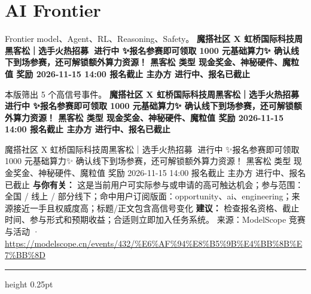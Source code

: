 \documentclass[10.5pt]{ctexart}
\begin{document}
\section*{AI Frontier}
{\color{ormuted} Frontier model、Agent、RL、Reasoning、Safety。}
\vspace{2mm}
{\LARGE\bfseries 魔搭社区 X 虹桥国际科技周黑客松｜选手火热招募🚀 进行中 ✨报名参赛即可领取 1000 元基础算力✨ 确认线下到场参赛，还可解锁额外算力资源！ 黑客松 类型 现金奖金、神秘硬件、魔粒值 奖励 2026-11-15 14:00 报名截止 主办方 进行中、报名已截止}\par
\vspace{1mm}
{\color{ormuted} 本版筛出 5 个高信号事件。}
\vspace{3mm}
{\Large\bfseries 魔搭社区 X 虹桥国际科技周黑客松｜选手火热招募🚀 进行中 ✨报名参赛即可领取 1000 元基础算力✨ 确认线下到场参赛，还可解锁额外算力资源！ 黑客松 类型 现金奖金、神秘硬件、魔粒值 奖励 2026-11-15 14:00 报名截止 主办方 进行中、报名已截止}\par
魔搭社区 X 虹桥国际科技周黑客松｜选手火热招募🚀 进行中 ✨报名参赛即可领取 1000 元基础算力✨ 确认线下到场参赛，还可解锁额外算力资源！ 黑客松 类型 现金奖金、神秘硬件、魔粒值 奖励 2026-11-15 14:00 报名截止 主办方 进行中、报名已截止
\textbf{与你有关：} 这是当前用户可实际参与或申请的高可触达机会；参与范围：全国 / 线上 / 部分线下；命中用户订阅版面：opportunity、ai、engineering；来源接近一手且权威度高；标题/正文包含高信号变化
\textbf{建议：} 检查报名资格、截止时间、参与形式和预期收益；合适则立即加入任务系统。
{\footnotesize\color{ormuted} 来源：ModelScope 竞赛与活动 · \url{https://modelscope.cn/events/432/%E6%AF%94%E8%B5%9B%E4%BB%8B%E7%BB%8D}}
\vspace{4mm}
\hrule height 0.25pt
\vspace{3mm}
\end{document}
